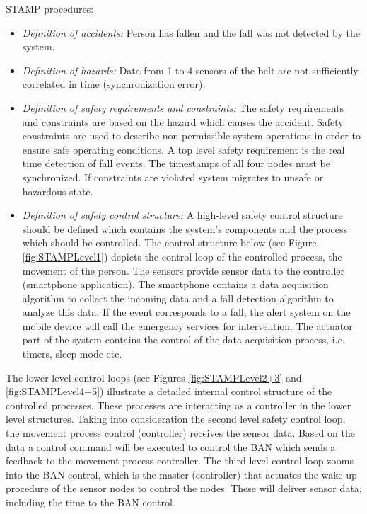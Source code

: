 \documentclass[10pt,journal,compsoc]{IEEEtran}
\begin{document}
STAMP procedures:

\begin{itemize}
	\item \textit{Definition of accidents:} Person has fallen and the fall was not detected by the system.
	\item \textit{Definition of hazards:} Data from 1 to 4 sensors of the belt are not sufficiently correlated in time (synchronization error).
	\item \textit{Definition of safety requirements and constraints:} The safety requirements and constraints are based on the hazard which causes the accident. Safety constraints are used to describe non-permissible system operations in order to ensure safe operating conditions. A top level safety requirement is the real time detection of fall events. The timestamps of all four nodes must be synchronized. If constraints are violated system migrates to unsafe or hazardous state.
	\item \textit{Definition of safety control structure:}
	A high-level safety control structure should be defined which contains the system's components and the process which should be controlled. The control structure below (see Figure. \ref{fig:STAMPLevel1}) depicts the control loop of the controlled process, the movement of the person.
	The sensors provide sensor data to the controller (smartphone application). The smartphone contains a data acquisition algorithm to collect the incoming data and a fall detection algorithm to analyze this data. If the event corresponds to a fall, the alert system on the mobile device will call the emergency services for intervention. The actuator part of the system contains the control of the data acquisition process, i.e. timers, sleep mode etc.
\end{itemize}	
	The lower level control loops (see Figures \ref{fig:STAMPLevel2+3} and \ref{fig:STAMPLevel4+5}) illustrate a detailed internal control structure of the controlled processes. These processes are interacting as a controller in the lower level structures. Taking into consideration the second level safety control loop, the movement process control (controller) receives the sensor data. Based on the data a control command will be executed to control the BAN which sends a feedback to the movement process controller. The third level control loop zooms into the BAN control, which is the master (controller) that actuates the wake up procedure of the sensor nodes to control the nodes. These will deliver sensor data, including the time to the BAN control.
\end{document}
